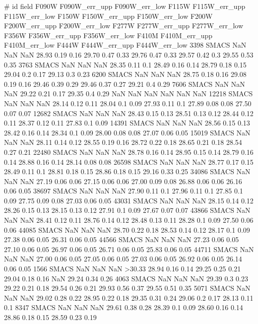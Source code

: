 # id field F090W F090W_err_upp F090W_err_low F115W F115W_err_upp F115W_err_low F150W  F150W_err_upp F150W_err_low F200W  F200W_err_upp F200W_err_low F277W  F277W_err_upp F277W_err_low F356W  F356W_err_upp F356W_err_low F410M  F410M_err_upp F410M_err_low F444W F444W_err_upp F444W_err_low
3398 SMACS  NaN  NaN  NaN 28.93 0.19 0.16  29.70 0.47 0.33  29.76 0.47 0.33  29.57 0.42 0.3    29.55 0.53 0.35
3763 SMACS  NaN  NaN  NaN 28.35 0.11 0.1  28.49 0.16 0.14  28.79 0.18 0.15  29.04 0.2 0.17    29.13 0.3 0.23
6200 SMACS  NaN  NaN  NaN 28.75 0.18 0.16  29.08 0.19 0.16  29.46 0.39 0.29  29.46 0.37 0.27    29.21 0.4 0.29
7606 SMACS  NaN  NaN  NaN 29.22 0.21 0.17  29.35 0.4 0.29   NaN  NaN  NaN  NaN  NaN  NaN
12218 SMACS  NaN  NaN  NaN 28.14 0.12 0.11  28.04 0.1 0.09  27.93 0.11 0.1  27.89 0.08 0.08    27.50 0.07 0.07
12682 SMACS  NaN  NaN  NaN 28.43 0.15 0.13  28.51 0.13 0.12  28.44 0.12 0.11  28.37 0.12 0.11    27.83 0.1 0.09
14391 SMACS  NaN  NaN  NaN 28.56 0.15 0.13  28.42 0.16 0.14  28.34 0.1 0.09  28.00 0.08 0.08    27.07 0.06 0.05
15019 SMACS  NaN  NaN  NaN 28.11 0.14 0.12  28.55 0.19 0.16  28.72 0.22 0.18  28.65 0.21 0.18    28.54 0.27 0.21
22480 SMACS  NaN  NaN  NaN 28.78 0.16 0.14  28.95 0.15 0.14  28.79 0.16 0.14  28.88 0.16 0.14    28.14 0.08 0.08
26598 SMACS  NaN  NaN  NaN 28.77 0.17 0.15  28.49 0.11 0.1  28.81 0.18 0.15  28.86 0.18 0.15    29.16 0.33 0.25
34086 SMACS  NaN  NaN  NaN 27.19 0.06 0.06  27.15 0.06 0.06  27.00 0.09 0.08  26.88 0.06 0.06    26.16 0.06 0.05
38697 SMACS  NaN  NaN  NaN 27.90 0.11 0.1  27.96 0.11 0.1  27.85 0.1 0.09  27.75 0.09 0.08    27.03 0.06 0.05
43031 SMACS  NaN  NaN  NaN 28.15 0.14 0.12  28.26 0.15 0.13  28.15 0.13 0.12  27.91 0.1 0.09    27.67 0.07 0.07
43866 SMACS  NaN  NaN  NaN 28.41 0.12 0.11  28.76 0.14 0.12  28.48 0.13 0.11  28.28 0.1 0.09    27.50 0.06 0.06
44085 SMACS  NaN  NaN  NaN 28.70 0.22 0.18  28.53 0.14 0.12  28.17 0.1 0.09  27.38 0.06 0.05    26.31 0.06 0.05
44566 SMACS  NaN  NaN  NaN 27.23 0.06 0.05  27.10 0.06 0.05  26.97 0.06 0.05  26.71 0.06 0.05    25.83 0.06 0.05
44711 SMACS  NaN  NaN  NaN 27.00 0.06 0.05  27.05 0.06 0.05  27.03 0.06 0.05  26.92 0.06 0.05    26.14 0.06 0.05
1566 SMACS  NaN  NaN  NaN >30.33 28.94 0.16 0.14  29.25 0.25 0.21  29.04 0.18 0.16   NaN 29.24 0.34 0.26
4063 SMACS  NaN  NaN  NaN 29.39 0.3 0.23  29.22 0.21 0.18  29.54 0.26 0.21  29.93 0.56 0.37    29.55 0.51 0.35
5071 SMACS  NaN  NaN  NaN 29.02 0.28 0.22  28.95 0.22 0.18  29.35 0.31 0.24  29.06 0.2 0.17    28.13 0.11 0.1
8347 SMACS  NaN  NaN  NaN 29.61 0.38 0.28  28.39 0.1 0.09  28.60 0.16 0.14  28.86 0.18 0.15    28.59 0.23 0.19
